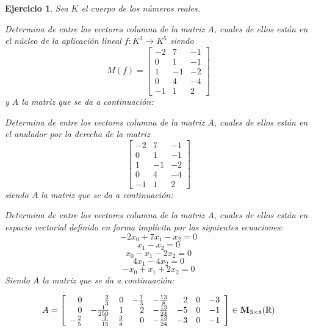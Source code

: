 \documentclass[12pt]{amsart}
\newtheorem{ejer}{Ejercicio}
\begin{document}
\begin{ejer} Sea $K$ el cuerpo de los n\'umeros reales.
\newline
\noindent\begin{minipage}{\textwidth}
\begin{tcolorbox}[colback = green!20!white,title=Versión Núcleo]
Determina de entre los vectores columna de la matriz $A$, cuales de ellos están en el núcleo de la aplicación lineal $f:K^{3} \to K^{5}$ siendo  $$ M(f) = \left[\begin{array}{rrr}
-2 & 7 & -1 \\
0 & 1 & -1 \\
1 & -1 & -2 \\
0 & 4 & -4 \\
-1 & 1 & 2
\end{array}\right] $$ y $A$ la matriz que se da a continuación:\end{tcolorbox}
\end{minipage} \newline
\noindent\begin{minipage}{\textwidth}
\begin{tcolorbox}[colback = blue!20!white,title=Versión Anulador]
Determina de entre los vectores columna de la matriz $A$, cuales de ellos están en el anulador por la derecha de la matriz $$ \left[\begin{array}{rrr}
-2 & 7 & -1 \\
0 & 1 & -1 \\
1 & -1 & -2 \\
0 & 4 & -4 \\
-1 & 1 & 2
\end{array}\right] $$ siendo $A$ la matriz que se da a continuación:\end{tcolorbox}
\end{minipage} \newline
\noindent\begin{minipage}{\textwidth} 
\begin{tcolorbox}[colback = red!20!white,title=Versión Ecuaciones Implícitas]
Determina de entre los vectores columna de la matriz $A$, cuales de ellos están en espacio vectorial definido en forma implícita por las siguientes ecuaciones:
\[ -2 x_{0} + 7 x_{1} - x_{2} = 0 \]
\[ x_{1} - x_{2} = 0 \]
\[ x_{0} - x_{1} - 2 x_{2} = 0 \]
\[ 4 x_{1} - 4 x_{2} = 0 \]
\[ -x_{0} + x_{1} + 2 x_{2} = 0 \]
Siendo $A$ la matriz que se da a continuación:
\end{tcolorbox}
\end{minipage}
\[ A = \left[\begin{array}{rrrrrrrr}
0 & \frac{2}{3} & 0 & -\frac{1}{3} & -\frac{13}{8} & 2 & 0 & -3 \\
0 & -\frac{1}{250} & 1 & 2 & -\frac{13}{24} & -5 & 0 & -1 \\
-\frac{2}{5} & \frac{1}{15} & \frac{3}{4} & 0 & -\frac{13}{24} & -3 & 0 & -1
\end{array}\right] \in {\bf M}_{3\times 8}({\mathbb R})\]
\end{ejer}
\end{document}
